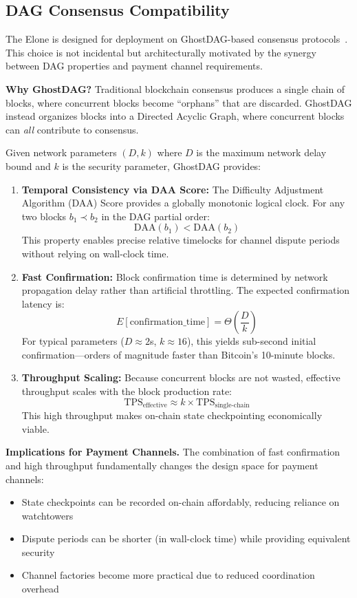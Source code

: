 \subsection{DAG Consensus Compatibility}

The Elone is designed for deployment on GhostDAG-based consensus protocols~\cite{sompolinsky2015ghostdag, kaspa2021}. This choice is not incidental but architecturally motivated by the synergy between DAG properties and payment channel requirements.

\textbf{Why GhostDAG?} Traditional blockchain consensus produces a single chain of blocks, where concurrent blocks become ``orphans'' that are discarded. GhostDAG instead organizes blocks into a Directed Acyclic Graph, where concurrent blocks can \textit{all} contribute to consensus.

Given network parameters $(D, k)$ where $D$ is the maximum network delay bound and $k$ is the security parameter, GhostDAG provides:

\begin{enumerate}
    \item \textbf{Temporal Consistency via DAA Score:} The Difficulty Adjustment Algorithm (DAA) Score provides a globally monotonic logical clock. For any two blocks $b_1 \prec b_2$ in the DAG partial order:
    $$\text{DAA}(b_1) < \text{DAA}(b_2)$$
    This property enables precise relative timelocks for channel dispute periods without relying on wall-clock time.
    
    \item \textbf{Fast Confirmation:} Block confirmation time is determined by network propagation delay rather than artificial throttling. The expected confirmation latency is:
    $$E[\text{confirmation\_time}] = \Theta\left(\frac{D}{k}\right)$$
    For typical parameters ($D \approx 2$s, $k \approx 16$), this yields sub-second initial confirmation---orders of magnitude faster than Bitcoin's 10-minute blocks.
    
    \item \textbf{Throughput Scaling:} Because concurrent blocks are not wasted, effective throughput scales with the block production rate:
    $$\text{TPS}_{\text{effective}} \approx k \times \text{TPS}_{\text{single-chain}}$$
    This high throughput makes on-chain state checkpointing economically viable.
\end{enumerate}

\textbf{Implications for Payment Channels.} The combination of fast confirmation and high throughput fundamentally changes the design space for payment channels:
\begin{itemize}
    \item State checkpoints can be recorded on-chain affordably, reducing reliance on watchtowers
    \item Dispute periods can be shorter (in wall-clock time) while providing equivalent security
    \item Channel factories become more practical due to reduced coordination overhead
\end{itemize}

